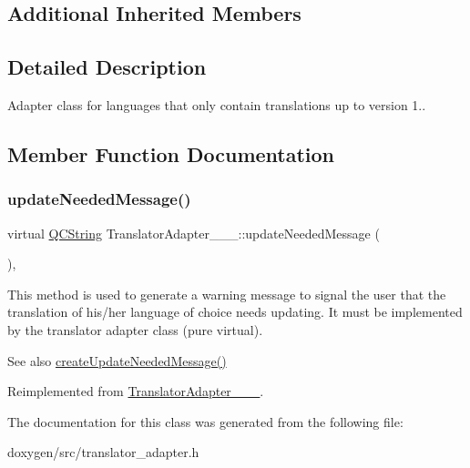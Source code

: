 \subsection*{Additional Inherited Members}


\subsection{Detailed Description}
Adapter class for languages that only contain translations up to version 1.. 

\subsection{Member Function Documentation}
\mbox{\label{class_translator_adapter__1__4__6_ab19b01d4e00c95ef1e6eb631fbe6ada4}} 
\subsubsection{\texorpdfstring{updateNeededMessage()}{updateNeededMessage()}}
{\footnotesize\ttfamily virtual \mbox{\hyperlink{class_q_c_string}{Q\+C\+String}} Translator\+Adapter\+\_\+\_\+\_\+::update\+Needed\+Message (\begin{DoxyParamCaption}{ }\end{DoxyParamCaption})\hspace{0.3cm}{\ttfamily [inline]}, {\ttfamily [virtual]}}

This method is used to generate a warning message to signal the user that the translation of his/her language of choice needs updating. It must be implemented by the translator adapter class (pure virtual).

\begin{DoxySeeAlso}{See also}
\mbox{\hyperlink{class_translator_adapter_base_a71493b87a34d6e4c232e540734aba698}{create\+Update\+Needed\+Message()}} 
\end{DoxySeeAlso}


Reimplemented from \mbox{\hyperlink{class_translator_adapter__1__5__4_a587a31dad925e47f206b6a0cda9eedd0}{Translator\+Adapter\+\_\+\_\+\_}}.



The documentation for this class was generated from the following file\+:\begin{DoxyCompactItemize}
\item 
doxygen/src/translator\+\_\+adapter.\+h\end{DoxyCompactItemize}
